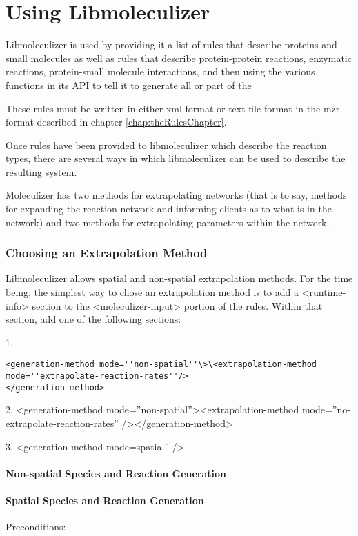 \chapter{Using Libmoleculizer}
\label{chap:usingLibmoleculizerChapter}

Libmoleculizer is used by providing it a list of rules that describe
proteins and small molecules as well as rules that describe
protein-protein reactions, enzymatic reactions, protein-small molecule
interactions, and then using the various functions in its API to tell
it to generate all or part of the 

These rules must be written in either xml format or text file format
in the mzr format described in chapter \ref{chap:theRulesChapter}.  

Once rules have been provided to libmoleculizer which describe the
reaction types, there are several ways in which libmoleculizer can be
used to describe the resulting system.  

Moleculizer has two methods for extrapolating networks (that is to
say, methods for expanding the reaction network and informing clients
as to what is in the network) and two methods for extrapolating
parameters within the network.  

\subsection{Choosing an Extrapolation Method}

Libmoleculizer allows spatial and non-spatial extrapolation methods.
For the time being, the simplest way to chose an extrapolation method
is to add a <runtime-info> section to the <moleculizer-input> portion
of the rules.  Within that section, add one of the following sections: 

1.
\begin{verbatim}
<generation-method mode=''non-spatial''\>\<extrapolation-method
mode=''extrapolate-reaction-rates''/>
</generation-method>
\end{verbatim}


2.
<generation-method mode=''non-spatial''><extrapolation-method
mode=''no-extrapolate-reaction-rates'' /></generation-method>

3.
<generation-method mode=spatial'' />


\subsubsection{Non-spatial Species and Reaction Generation}
\subsubsection{Spatial Species and Reaction Generation}

Preconditions:



